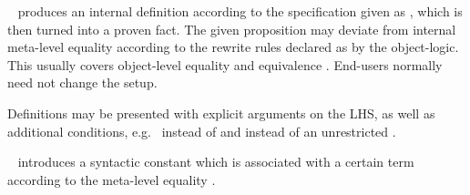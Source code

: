 \begin{isabellebody}
\begin{isamarkuptext}
\begin{description}
  \item \hyperlink{command.definition}{\mbox{}}~ produces an
  internal definition  according to the specification
  given as , which is then turned into a proven fact.  The
  given proposition may deviate from internal meta-level equality
  according to the rewrite rules declared as \hyperlink{attribute.defn}{\mbox{}} by the
  object-logic.  This usually covers object-level equality  and equivalence .  End-users normally need not
  change the \hyperlink{attribute.defn}{\mbox{}} setup.
  
  Definitions may be presented with explicit arguments on the LHS, as
  well as additional conditions, e.g.\  instead of
   and  instead of an
  unrestricted .
  
  \item \hyperlink{command.abbreviation}{\mbox{}}~ introduces a
  syntactic constant which is associated with a certain term according
  to the meta-level equality .
  

\end{description}
\end{isamarkuptext}
\end{isabellebody}
